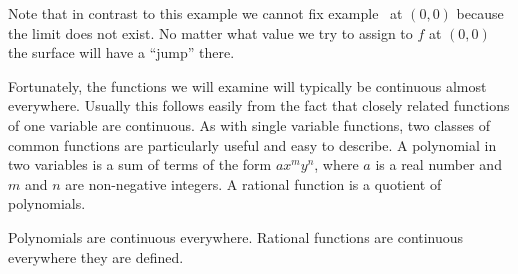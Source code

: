 Note that in contrast to this example we cannot fix
example~ at $(0,0)$ because the limit does not
exist. No matter what value we try to assign to $f$ at $(0,0)$ the
surface will have a ``jump'' there. 

Fortunately, the functions we will examine will typically be
continuous almost everywhere. Usually this follows easily from the
fact that closely related functions of one variable are continuous.
As with single variable functions, two classes of common functions are
particularly useful and easy to describe. A
polynomial in two
variables is a sum of terms of the form $ax^my^n$, where $a$ is a real
number and $m$ and $n$ are non-negative integers. A rational
function
is a quotient of polynomials.

\begin{theorem} Polynomials are continuous everywhere. Rational functions are
continuous everywhere they are defined.
\end{theorem}

